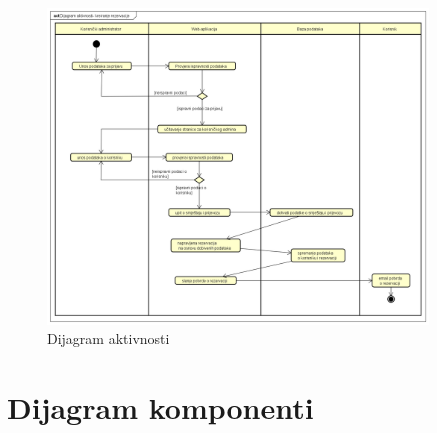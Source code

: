 			 	\begin{figure}[htbp]
			 	\centering
			 	\includegraphics[width=0.9\textwidth]{dijagrami/dijagramAktivnosti.png}
			 	\caption{Dijagram aktivnosti}
			 	\label{fig:dijaramAktivnosti}
			 \end{figure}
			
			\eject
		\section{Dijagram komponenti}
		
